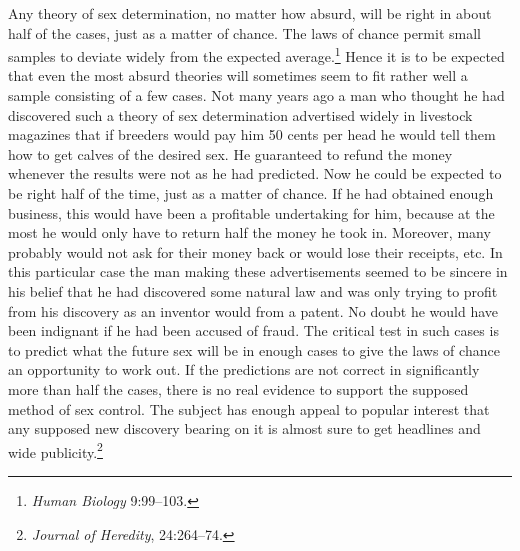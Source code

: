Any theory of sex determination, no matter how absurd, will be right in
about half of the cases, just as a matter of chance. The laws of chance permit
small samples to deviate widely from the expected average.\footnote{\textit{Human
Biology} 9:99--103.} Hence it is to be expected that even the most absurd theories will
sometimes seem to fit rather well a sample consisting of a few cases. Not
many years ago a man who thought he had discovered such a theory of
sex determination advertised widely in livestock magazines that if
breeders would pay him 50 cents per head he would tell them how to
get calves of the desired sex. He guaranteed to refund the money whenever
the results were not as he had predicted. Now he could be expected
to be right half of the time, just as a matter of chance. If he had
obtained enough business, this would have been a profitable undertaking
for him, because at the most he would only have to return half the
money he took in. Moreover, many probably would not ask for their
money back or would lose their receipts, etc. In this particular case the
man making these advertisements seemed to be sincere in his belief that
he had discovered some natural law and was only trying to profit from
his discovery as an inventor would from a patent. No doubt he would
have been indignant if he had been accused of fraud. The critical test in
such cases is to predict what the future sex will be in enough cases to
give the laws of chance an opportunity to work out. If the predictions
are not correct in significantly more than half the cases, there is no real
evidence to support the supposed method of sex control. The subject
has enough appeal to popular interest that any supposed new discovery
bearing on it is almost sure to get headlines and wide
publicity.\footnote{\textit{Journal of Heredity}, 24:264--74.}

